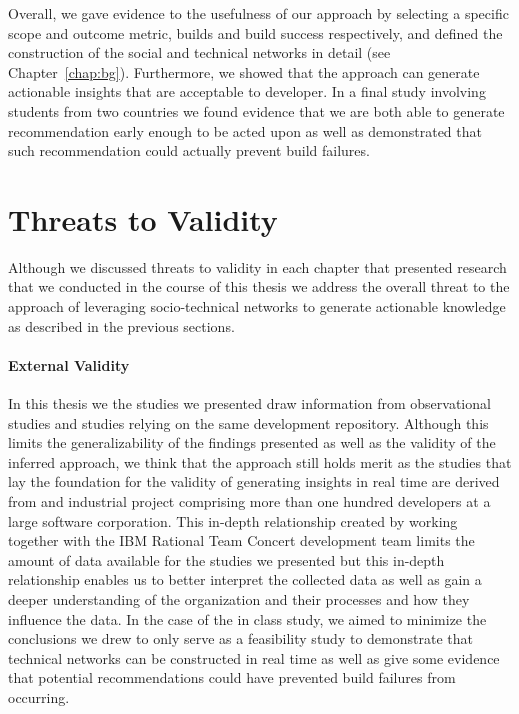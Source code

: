 Overall, we gave evidence to the usefulness of our approach by selecting a specific scope and outcome metric, builds and build success respectively, and defined the construction of the social and technical networks in detail (see Chapter~\ref{chap:bg}).
Furthermore, we showed that the approach can generate actionable insights that are acceptable to developer.
In a final study involving students from two countries we found evidence that we are both able to generate recommendation early enough to be acted upon as well as demonstrated that such recommendation could actually prevent build failures.


\section{Threats to Validity}
Although we discussed threats to validity in each chapter that presented research that we conducted in the course of this thesis we  address the overall threat to the approach of leveraging socio-technical networks to generate actionable knowledge as described in the previous sections.

\paragraph{External Validity}
In this thesis we the studies we presented draw information from observational studies and studies relying on the same development repository.
Although this limits the generalizability of the findings presented as well as the validity of the inferred approach, we think that the approach still holds merit as the studies that lay the foundation for the validity of generating insights in real time are derived from and industrial project comprising more than one hundred developers at a large software corporation.
This in-depth relationship created by working together with the IBM Rational Team Concert development team limits the amount of data available for the studies we presented but this in-depth relationship enables us to better interpret the collected data as well as gain a deeper understanding of the organization and their processes and how they influence the data.
In the case of the in class study, we aimed to minimize the conclusions we drew to only serve as a feasibility study to demonstrate that technical networks can be constructed in real time as well as give some evidence that potential recommendations could have prevented build failures from occurring.

